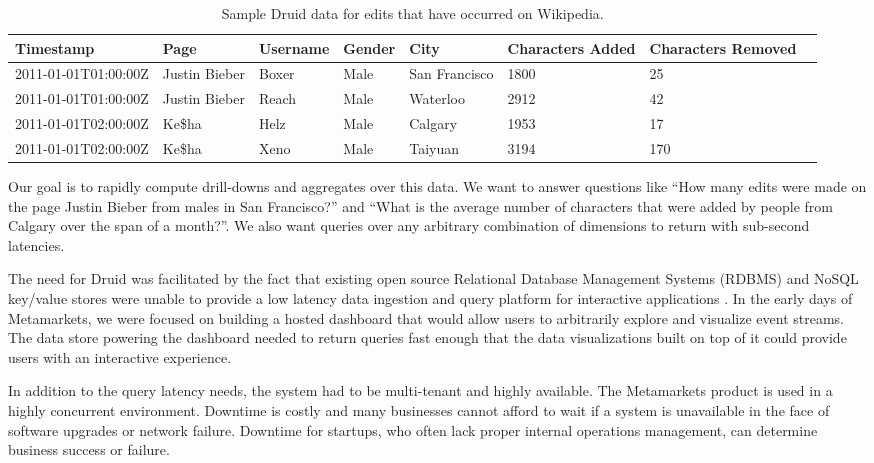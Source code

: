 \documentclass{sig-alternate-2013}
\begin{document}
\begin{table}
  \centering
  \begin{tabular}{| l | l | l | l | l | l | l | l |}
    \hline
    \textbf{Timestamp} & \textbf{Page} & \textbf{Username} & \textbf{Gender} & \textbf{City} & \textbf{Characters Added} & \textbf{Characters Removed} \\ \hline
    2011-01-01T01:00:00Z & Justin Bieber & Boxer & Male & San Francisco & 1800 & 25 \\ \hline
    2011-01-01T01:00:00Z & Justin Bieber & Reach & Male & Waterloo & 2912 & 42 \\ \hline
    2011-01-01T02:00:00Z & Ke\$ha & Helz & Male & Calgary & 1953 & 17 \\ \hline
    2011-01-01T02:00:00Z & Ke\$ha & Xeno & Male & Taiyuan & 3194 & 170 \\ \hline
  \end{tabular}
  \caption{Sample Druid data for edits that have occurred on Wikipedia.}
  \label{tab:sample_data}
\end{table}

Our goal is to rapidly compute drill-downs and aggregates over this data. We
want to answer questions like “How many edits were made on the page Justin
Bieber from males in San Francisco?” and “What is the average number of
characters that were added by people from Calgary over the span of a month?”. We also
want queries over any arbitrary combination of dimensions to return with
sub-second latencies.

The need for Druid was facilitated by the fact that existing open source
Relational Database Management Systems (RDBMS) and NoSQL key/value stores were
unable to provide a low latency data ingestion and query platform for
interactive applications \cite{tschetter2011druid}. In the early days of
Metamarkets, we were focused on building a hosted dashboard that would allow
users to arbitrarily explore and visualize event streams.  The data store
powering the dashboard needed to return queries fast enough that the data
visualizations built on top of it could provide users with an interactive
experience. 

In addition to the query latency needs, the system had to be multi-tenant and
highly available. The Metamarkets product is used in a highly concurrent
environment. Downtime is costly and many businesses cannot afford to wait if a
system is unavailable in the face of software upgrades or network failure.
Downtime for startups, who often lack proper internal operations management, can
determine business success or failure.  
\end{document}
